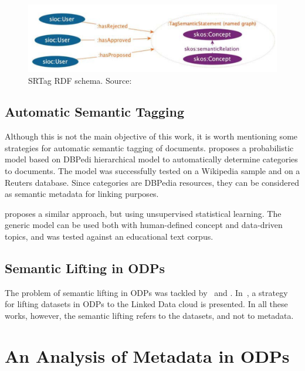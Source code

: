 \begin{figure}[tb]
\begin{center}
\includegraphics[width=\columnwidth]{images/SRTag.png}
\caption[SRTag RDF schema.]{SRTag RDF schema. Source: }
\label{fig:srtag}
\end{center}
\end{figure}

\subsection{Automatic Semantic Tagging}
\label{sec:automatic_semtags}
Although this is not the main objective of this work, it is worth mentioning some strategies for automatic semantic tagging of documents.
 proposes a probabilistic model based on DBPedi hierarchical model to automatically determine categories to documents.
The model was successfully tested on a Wikipedia sample and on a Reuters database.
Since categories are DBPedia resources, they can be considered as semantic metadata for linking purposes.

 proposes a similar approach, but using unsupervised statistical learning.
The generic model can be used both with human-defined concept and data-driven topics, and was tested against an educational text corpus.

\subsection{Semantic Lifting in ODPs}
The problem of semantic lifting in ODPs was tackled by~ and . 
In~, a strategy for lifting datasets in ODPs to the Linked Data cloud is presented. 
In all these works, however, the semantic lifting refers to the datasets, and not to metadata.

\section{An Analysis of Metadata in ODPs}
\label{sec:analysis} 


